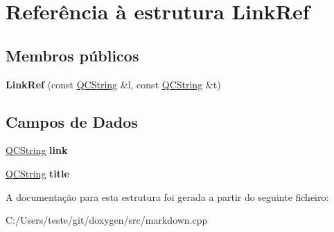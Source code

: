 \hypertarget{struct_link_ref}{\section{Referência à estrutura Link\-Ref}
\label{struct_link_ref}
}
\subsection*{Membros públicos}
\begin{DoxyCompactItemize}
\item 
\hypertarget{struct_link_ref_a92f09d4009266179b674b48c1514e568}{{\bfseries Link\-Ref} (const \hyperlink{class_q_c_string}{Q\-C\-String} \&l, const \hyperlink{class_q_c_string}{Q\-C\-String} \&t)}\label{struct_link_ref_a92f09d4009266179b674b48c1514e568}

\end{DoxyCompactItemize}
\subsection*{Campos de Dados}
\begin{DoxyCompactItemize}
\item 
\hypertarget{struct_link_ref_a4e8e3bd5675cdcae4a19397176f610fc}{\hyperlink{class_q_c_string}{Q\-C\-String} {\bfseries link}}\label{struct_link_ref_a4e8e3bd5675cdcae4a19397176f610fc}

\item 
\hypertarget{struct_link_ref_a42bb80709d086df855babb087e63794b}{\hyperlink{class_q_c_string}{Q\-C\-String} {\bfseries title}}\label{struct_link_ref_a42bb80709d086df855babb087e63794b}

\end{DoxyCompactItemize}


A documentação para esta estrutura foi gerada a partir do seguinte ficheiro\-:\begin{DoxyCompactItemize}
\item 
C\-:/\-Users/teste/git/doxygen/src/markdown.\-cpp\end{DoxyCompactItemize}
